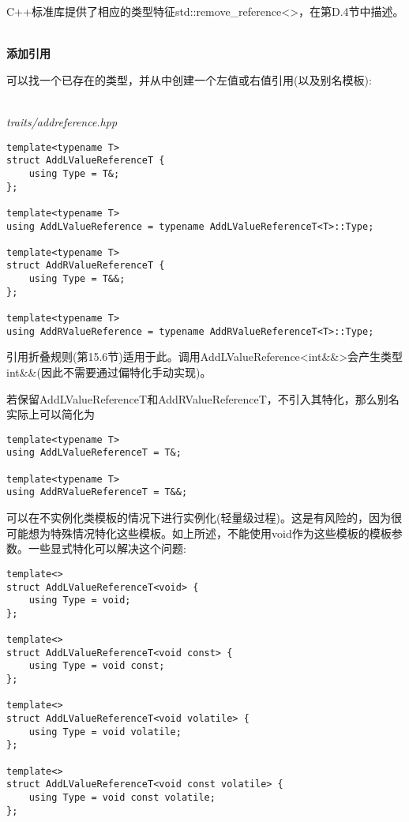 C++标准库提供了相应的类型特征std::remove\_reference<>，在第D.4节中描述。

\hspace*{\fill} \\ %
\noindent
\textbf{添加引用}

可以找一个已存在的类型，并从中创建一个左值或右值引用(以及别名模板):

\hspace*{\fill} \\ %
\noindent
\textit{traits/addreference.hpp}
\begin{lstlisting}[style=styleCXX]
template<typename T>
struct AddLValueReferenceT {
	using Type = T&;
};

template<typename T>
using AddLValueReference = typename AddLValueReferenceT<T>::Type;

template<typename T>
struct AddRValueReferenceT {
	using Type = T&&;
};

template<typename T>
using AddRValueReference = typename AddRValueReferenceT<T>::Type;
\end{lstlisting}

引用折叠规则(第15.6节)适用于此。调用AddLValueReference<int\&\&>会产生类型int\&\&(因此不需要通过偏特化手动实现)。

若保留AddLValueReferenceT和AddRValueReferenceT，不引入其特化，那么别名实际上可以简化为

\begin{lstlisting}[style=styleCXX]
template<typename T>
using AddLValueReferenceT = T&;

template<typename T>
using AddRValueReferenceT = T&&;
\end{lstlisting}

可以在不实例化类模板的情况下进行实例化(轻量级过程)。这是有风险的，因为很可能想为特殊情况特化这些模板。如上所述，不能使用void作为这些模板的模板参数。一些显式特化可以解决这个问题:

\begin{lstlisting}[style=styleCXX]
template<>
struct AddLValueReferenceT<void> {
	using Type = void;
};

template<>
struct AddLValueReferenceT<void const> {
	using Type = void const;
};

template<>
struct AddLValueReferenceT<void volatile> {
	using Type = void volatile;
};

template<>
struct AddLValueReferenceT<void const volatile> {
	using Type = void const volatile;
};
\end{lstlisting}

